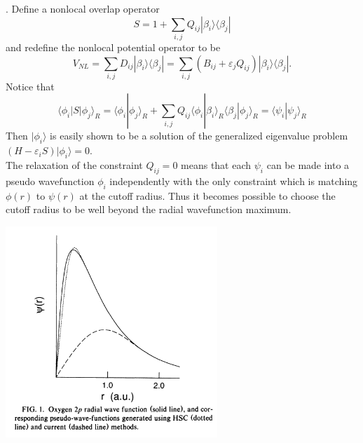 \documentclass[UTF8]{ctexart}
\begin{document}
            . Define a nonlocal overlap operator
            \begin{equation}
                S=1+\sum_{i,j}Q_{ij}|\beta_i\rangle\langle\beta_j|
            \end{equation}
            and redefine the nonlocal potential operator to be
            \begin{equation}
                V_{NL}=\sum_{i,j}D_{ij}|\beta_i\rangle\langle\beta_j|=\sum_{i,j}(B_{ij}+\varepsilon_jQ_{ij})|\beta_i\rangle\langle\beta_j|.
            \end{equation}
            Notice that
            \begin{equation}
                \langle\phi_i|S|\phi_j\rangle_R=\langle\phi_i|\phi_j\rangle_R+\sum_{i,j}Q_{ij}\langle\phi_i|\beta_i\rangle_R\langle\beta_j|\phi_j\rangle_R
                =\langle\psi_i|\psi_j\rangle_R
            \end{equation}
            Then $|\phi_i\rangle$ is easily shown to be a solution of the generalized eigenvalue problem $(H-\varepsilon_iS)|\phi_i\rangle=0$.\\
            \indent The relaxation of the constraint $Q_{ij}=0$ means that each $\psi_i$ can be made into a pseudo wavefunction $\phi_i$ independently with the only
            constraint which is matching $\phi(r)$ to $\psi(r)$ at the cutoff radius. Thus it becomes possible to choose the cutoff radius to be well beyond
            the radial wavefunction maximum.
            \begin{center}
                \includegraphics[width = 8cm]{1.png}
            \end{center}
\end{document}
